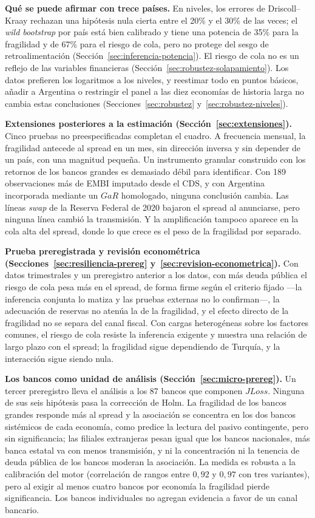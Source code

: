 \textbf{Qué se puede afirmar con trece países.} En niveles, los errores de Driscoll--Kraay rechazan una hipótesis nula cierta entre el 20\% y el 30\% de las veces; el \textit{wild bootstrap} por país está bien calibrado y tiene una potencia de 35\% para la fragilidad y de 67\% para el riesgo de cola, pero no protege del sesgo de retroalimentación (Sección~\ref{sec:inferencia-potencia}). El riesgo de cola no es un reflejo de las variables financieras (Sección~\ref{sec:robustez-solapamiento}). Los datos prefieren los logaritmos a los niveles, y reestimar todo en puntos básicos, añadir a Argentina o restringir el panel a las diez economías de historia larga no cambia estas conclusiones (Secciones~\ref{sec:robustez} y~\ref{sec:robustez-niveles}).

\textbf{Extensiones posteriores a la estimación (Sección~\ref{sec:extensiones}).} Cinco pruebas no preespecificadas completan el cuadro. A frecuencia mensual, la fragilidad antecede al spread en un mes, sin dirección inversa y sin depender de un país, con una magnitud pequeña. Un instrumento granular construido con los retornos de los bancos grandes es demasiado débil para identificar. Con 189 observaciones más de EMBI imputado desde el CDS, y con Argentina incorporada mediante un $GaR$ homologado, ninguna conclusión cambia. Las líneas \textit{swap} de la Reserva Federal de 2020 bajaron el spread al anunciarse, pero ninguna línea cambió la transmisión. Y la amplificación tampoco aparece en la cola alta del spread, donde lo que crece es el peso de la fragilidad por separado.

\textbf{Prueba preregistrada y revisión econométrica (Secciones~\ref{sec:resiliencia-prereg} y~\ref{sec:revision-econometrica}).} Con datos trimestrales y un preregistro anterior a los datos, con más deuda pública el riesgo de cola pesa más en el spread, de forma firme según el criterio fijado ---la inferencia conjunta lo matiza y las pruebas externas no lo confirman---, la adecuación de reservas no atenúa la de la fragilidad, y el efecto directo de la fragilidad no se separa del canal fiscal. Con cargas heterogéneas sobre los factores comunes, el riesgo de cola resiste la inferencia exigente y muestra una relación de largo plazo con el spread; la fragilidad sigue dependiendo de Turquía, y la interacción sigue siendo nula.

\textbf{Los bancos como unidad de análisis (Sección~\ref{sec:micro-prereg}).} Un tercer preregistro lleva el análisis a los 87 bancos que componen $JLoss$. Ninguna de sus seis hipótesis pasa la corrección de Holm. La fragilidad de los bancos grandes responde más al spread y la asociación se concentra en los dos bancos sistémicos de cada economía, como predice la lectura del pasivo contingente, pero sin significancia; las filiales extranjeras pesan igual que los bancos nacionales, más banca estatal va con menos transmisión, y ni la concentración ni la tenencia de deuda pública de los bancos moderan la asociación. La medida es robusta a la calibración del motor (correlación de rangos entre $0{,}92$ y $0{,}97$ con tres variantes), pero al exigir al menos cuatro bancos por economía la fragilidad pierde significancia. Los bancos individuales no agregan evidencia a favor de un canal bancario.

